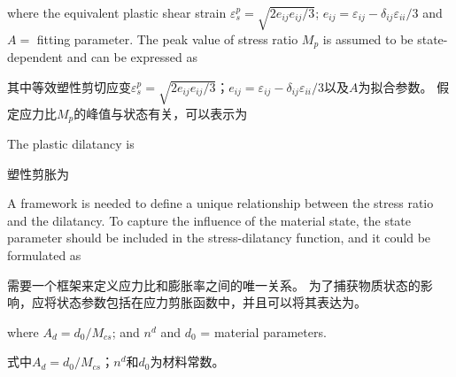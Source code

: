 \begin{ParaColumn}
    \noindent
    where the equivalent plastic shear strain $\varepsilon_{s}^{p}=\sqrt{2 e_{i j} e_{i j} / 3}$; $e_{i j}=\varepsilon_{i j}-\delta_{i j} \varepsilon_{i i}/3$ and $A=$ fitting parameter. The peak value of stress ratio $M_{p}$ is assumed to be state-dependent and can be expressed as \citep{Manzari1997}

    \switchcolumn

    \noindent
    其中等效塑性剪切应变$\varepsilon_{s}^{p}=\sqrt{2 e_{i j} e_{i j} / 3}$；$e_{i j}=\varepsilon_{i j}-\delta_{i j} \varepsilon_{i i}/3$以及$A$为拟合参数。 假定应力比$M_{p}$的峰值与状态有关，可以表示为\citep{Manzari1997}

    \switchcolumn*

    The plastic dilatancy is

    \switchcolumn
    
    塑性剪胀为

    \switchcolumn*

    \noindent
    A framework is needed to define a unique relationship between the stress ratio and the dilatancy. To capture the influence of the material state, the state parameter should be included in the stress-dilatancy function, and it could be formulated as \citep{Li2000,Gajo2001}

    \switchcolumn

    \noindent
    需要一个框架来定义应力比和膨胀率之间的唯一关系。 为了捕获物质状态的影响，应将状态参数包括在应力剪胀函数中，并且可以将其表达为\citep{Li2000,Gajo2001}。

    \switchcolumn*

    \noindent
    where $A_{d}=d_{0} / M_{c s}$; and $n^{d}$ and $d_{0}$ = material parameters.

    \switchcolumn

    \noindent
    式中$A_{d}=d_{0} / M_{c s}$；$n^{d}$和$d_{0}$为材料常数。


\end{ParaColumn}
